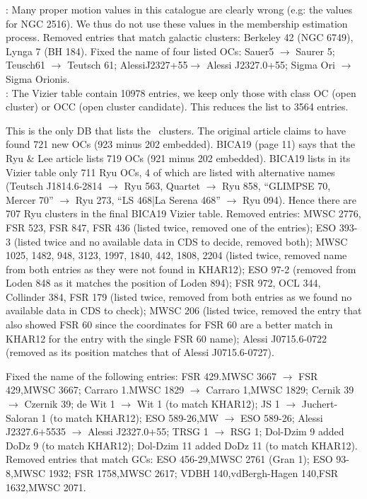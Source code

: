 \documentclass[fleqn,usenatbib]{mnras}
\begin{document}
\noindent\cite{Loktin_2017}: Many proper motion values in this catalogue are clearly
wrong (e.g: the values for NGC 2516). We thus do not use these values in the
membership estimation process.
Removed entries that match galactic clusters: Berkeley 42 (NGC 6749), Lynga 7
(BH 184).
Fixed the name of four listed OCs: Sauer5 $\rightarrow$ Saurer 5;
Teusch61 $\rightarrow$ Teutsch 61; AlessiJ2327+55$\rightarrow$ Alessi J2327.0+55;
Sigma Ori $\rightarrow$ Sigma Orionis.\\

\noindent\cite{Bica_2019}: The Vizier table contain 10978 entries, we keep only those
with class OC (open cluster) or OCC (open cluster candidate). This
reduces the list to 3564 entries.

This is the only DB that lists the~\cite{Ryu_2018} clusters. The original
article claims to have found 721 new OCs (923 minus 202 embedded). BICA19 (page
11) says that the Ryu \& Lee article lists 719 OCs (921 minus 202 embedded).
BICA19 lists in its Vizier table only 711 Ryu OCs, 4 of which are listed with
alternative names (Teutsch J1814.6-2814 $\rightarrow$ Ryu 563,
Quartet $\rightarrow$ Ryu 858, ``GLIMPSE 70, Mercer 70'' $\rightarrow$ Ryu 273,
``LS 468|La Serena 468'' $\rightarrow$ Ryu 094). Hence there are
707 Ryu clusters in the final BICA19 Vizier table.
Removed entries: MWSC 2776, FSR 523, FSR 847, FSR 436 (listed twice, removed
one of the entries); ESO 393-3 (listed twice and no available data in CDS to
decide, removed both); MWSC 1025, 1482, 948, 3123, 1997, 1840, 442, 1808, 2204
(listed twice, removed name from both entries as they were not found in KHAR12);
ESO 97-2 (removed from Loden 848 as it matches the position of Loden 894);
FSR 972, OCL 344, Collinder 384, FSR 179 (listed twice, removed from both
entries as we found no available data in CDS to check);
MWSC 206 (listed twice, removed the entry that also showed FSR 60 since the
coordinates for FSR 60 are a better match in KHAR12 for the entry with the
single FSR 60 name); Alessi J0715.6-0722 (removed as its position matches that
of Alessi J0715.6-0727).

Fixed the name of the following entries: FSR 429.MWSC 3667 $\rightarrow$ FSR
429,MWSC 3667; Carraro 1.MWSC 1829 $\rightarrow$ Carraro 1,MWSC 1829;
Cernik 39 $\rightarrow$ Czernik 39; de Wit 1 $\rightarrow$ Wit 1 (to match KHAR12);
JS 1 $\rightarrow$ Juchert-Saloran 1 (to match KHAR12);
ESO 589-26,MW $\rightarrow$ ESO 589-26; Alessi J2327.6+5535 $\rightarrow$ Alessi
J2327.0+55; TRSG 1 $\rightarrow$ RSG 1; Dol-Dzim 9 added DoDz 9 (to match
KHAR12); Dol-Dzim 11 added DoDz 11 (to match KHAR12).
Removed entries that match GCs: ESO 456-29,MWSC 2761 (Gran 1);
ESO 93-8,MWSC 1932; FSR 1758,MWSC 2617; VDBH 140,vdBergh-Hagen 140,FSR 1632,MWSC
2071.\\
\end{document}

